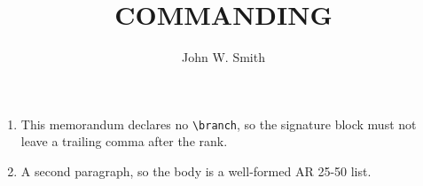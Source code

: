 \documentclass{../armymemo}
\author{John W. Smith}\rank{CPT}
\title{COMMANDING}
\begin{document}
\begin{enumerate}
	\item This memorandum declares no \verb|\branch|, so the signature block must not
	      leave a trailing comma after the rank.
	\item A second paragraph, so the body is a well-formed AR 25-50 list.
\end{enumerate}
\end{document}
